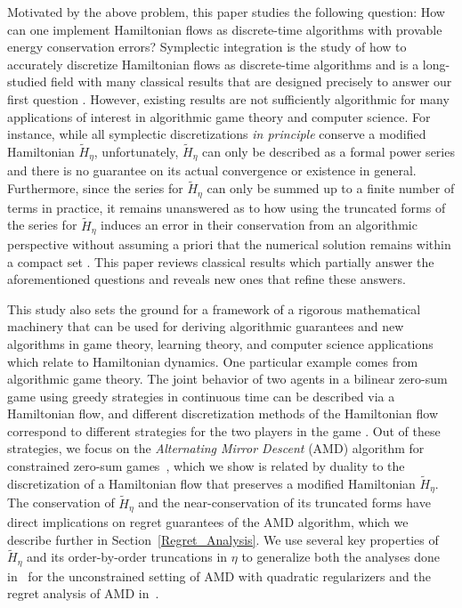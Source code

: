 \documentclass[11pt]{article}
\begin{document}
Motivated by the above problem, this paper studies the following question: How can one implement Hamiltonian flows as discrete-time algorithms with provable energy conservation errors? Symplectic integration is the study of how to accurately discretize Hamiltonian flows as discrete-time algorithms and is a long-studied field with many classical results that are designed precisely to answer our first question \citep[e.g.,][]{Channell1990,Yoshida1990,Yoshida1993,Hairer2006}. However, existing results are not sufficiently algorithmic for many applications of interest in algorithmic game theory and computer science. For instance, while all symplectic discretizations {\em in principle} conserve a modified Hamiltonian $\widetilde{H}_{\eta}$, unfortunately, $\widetilde{H}_{\eta}$ can only be described as a formal power series and there is no guarantee on its actual convergence or existence in general. Furthermore, since the series for $\widetilde{H}_{\eta}$ can only be summed up to a finite number of terms in practice, it remains unanswered as to how using the truncated forms of the series for $\widetilde{H}_{\eta}$ induces an error in their conservation from an algorithmic perspective without assuming a priori that the numerical solution remains within a compact set \citep[Chapter IX]{Hairer2006}. This paper reviews classical results which partially answer the aforementioned questions and reveals new ones that refine these answers.

This study also sets the ground for a framework of a rigorous mathematical machinery that can be used for deriving algorithmic guarantees and new algorithms in game theory, learning theory, and computer science applications which relate to Hamiltonian dynamics. One particular example comes from algorithmic game theory. The joint behavior of two agents in a bilinear zero-sum game using greedy strategies in continuous time can be described via a Hamiltonian flow, and different discretization methods of the Hamiltonian flow correspond to different strategies for the two players in the game \citep{hofbauer1996evolutionary,bailey2019multi}. 
Out of these strategies, we focus on the {\em Alternating Mirror Descent} (AMD) algorithm for constrained zero-sum games~\citep{Wibisono2022}, which we show is related by duality to the discretization of a Hamiltonian flow that preserves a modified Hamiltonian $\widetilde{H}_{\eta}$. The conservation of $\widetilde{H}_{\eta}$ and the near-conservation of its truncated forms have direct implications on regret guarantees of the AMD algorithm, which we describe further in Section~\ref{Regret_Analysis}. We use several key properties of $\widetilde{H}_{\eta}$ and its order-by-order truncations in $\eta$ to generalize both the analyses done in~\cite{pmlr-v125-bailey20a} for the unconstrained setting of AMD with quadratic regularizers and the regret analysis of AMD in~\cite{Wibisono2022}.
\end{document}
